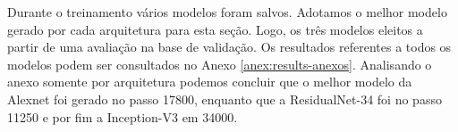Durante o treinamento vários modelos foram salvos. Adotamos o melhor modelo gerado por cada arquitetura para esta seção. Logo, os três modelos eleitos a partir de uma avaliação na base de validação. Os resultados referentes a todos os modelos podem ser consultados no Anexo \ref{anex:results-anexos}. Analisando o anexo somente por arquitetura podemos concluir que o melhor modelo da Alexnet foi gerado no passo 17800, enquanto que a ResidualNet-34 foi no passo 11250 e por fim a Inception-V3 em 34000.   

